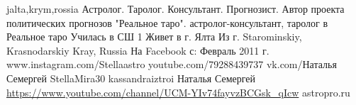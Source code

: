 
 
 
 
 

\par
jalta,krym,rossia
Астролог. Таролог. Консультант. Прогнозист. Автор проекта политических прогнозов "Реальное таро".
астролог-консультант, таролог в Реальное таро
Училась в СШ 1
Живет в г. Ялта
Из г. Starominskiy, Krasnodarskiy Kray, Russia
На Facebook с: Февраль 2011 г.
www.instagram.com/Stellaastro
youtube.com/79288439737
vk.com/Наталья Семергей
StellaMira30
kassandraiztroi
Наталья Семергей
\url{https://www.youtube.com/channel/UCM-YIv74fayvzBCGsk_qIcw}
astropro.ru

